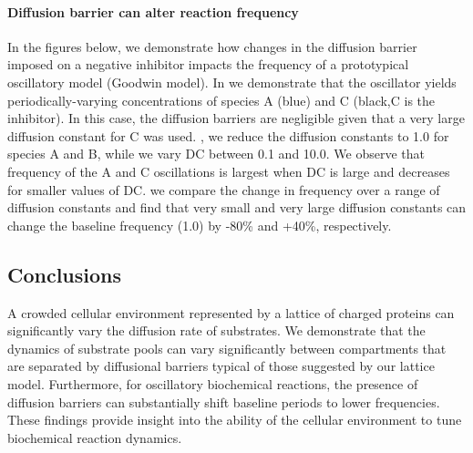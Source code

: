 \paragraph*{Diffusion barrier can alter reaction frequency} 
In the figures below, we demonstrate how changes in the diffusion barrier imposed on a negative inhibitor impacts the frequency of a prototypical oscillatory model (Goodwin model). 
In  we demonstrate that the oscillator yields periodically-varying concentrations of species A (blue) and C (black,C is the inhibitor). In this case, the diffusion barriers are negligible given that a very large diffusion constant for C was used. , we reduce the diffusion constants to 1.0 for species A and B, while we vary DC between 0.1 and 10.0. We observe that frequency of the A and C oscillations is largest when DC is large and decreases for smaller values of DC.  we compare the change in frequency over a range of diffusion constants and find that very small and very large diffusion constants can change the baseline frequency (1.0) by -80\% and +40\%, respectively. 


\subsection{Conclusions} 
A crowded cellular environment represented by a lattice of charged proteins can significantly vary the diffusion rate of substrates. 
We demonstrate that the dynamics of substrate pools can vary significantly between compartments that are separated by diffusional barriers typical of those suggested by our lattice model.
Furthermore, for oscillatory biochemical reactions, the presence of diffusion barriers can substantially shift baseline periods to lower frequencies. 
These findings provide insight into the ability of the cellular environment to tune biochemical reaction dynamics. 

%
%
%	
	
